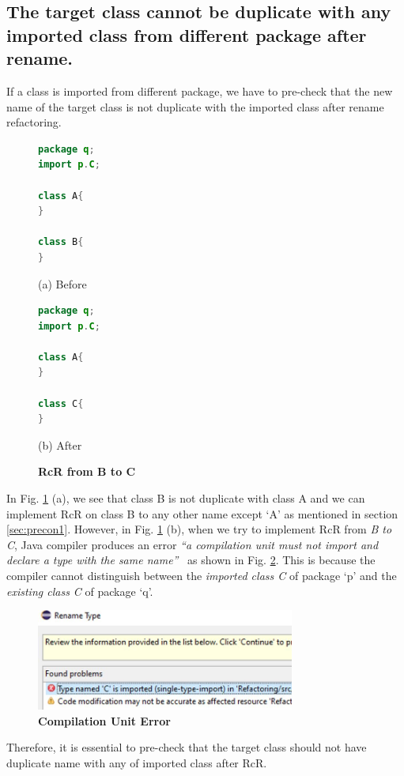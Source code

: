 \subsection{The target class cannot be duplicate with any imported class from different package after rename.}

If a class is imported from different package, we have to pre-check that the new name of the target class is not duplicate with the imported class after rename refactoring. 

\begin{figure}[th]
\centering
\begin{minipage}[t]{0.4\linewidth}
\begin{lstlisting}[language=java, basicstyle=\scriptsize\ttfamily,frame=single]
package q;
import p.C;

class A{
}

class B{
} 
\end{lstlisting}
\centering(a) Before
\end{minipage}
\hfill
\begin{minipage}[t]{0.4\linewidth}
\begin{lstlisting}[language=java, basicstyle=\scriptsize\ttfamily,frame=single]
package q;
import p.C;

class A{
}

class C{
} 
\end{lstlisting}
\centering(b) After
\end{minipage}
\caption{\textbf{RcR from B to C}}
\label{figure:fig2}
\end{figure}

In Fig. \ref{figure:fig2} (a), we see that class B is not duplicate with class A and we can implement RcR on class B to any other name except `A' as mentioned in section \ref{sec:precon1}. However, in Fig. \ref{figure:fig2} (b), when we try to implement RcR from \emph{B to C}, Java compiler produces an error \textit{``a compilation unit must not import and declare a type with the same name''}~\cite{EclipseWebPage} as shown in Fig. \ref{figure:comperr}. This is because the compiler cannot distinguish between the \emph{imported class C} of package `p' and the \emph{existing class C} of package `q'. 

\begin{figure}[H]
\centerline{\includegraphics[width=85mm,scale=0.5]{CUE.jpg}}
\caption{\textbf{Compilation Unit Error} }
\label{figure:comperr}
\end{figure}

Therefore, it is essential to pre-check that the target class should not have duplicate name with any of imported class after RcR.
